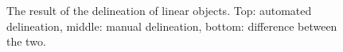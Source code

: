\begin{figure}
	\centering
	\caption{The result of the delineation of linear objects. Top: automated delineation, middle: manual delineation, bottom: difference between the two.}
	\label{fig:linear}
\end{figure}

%

